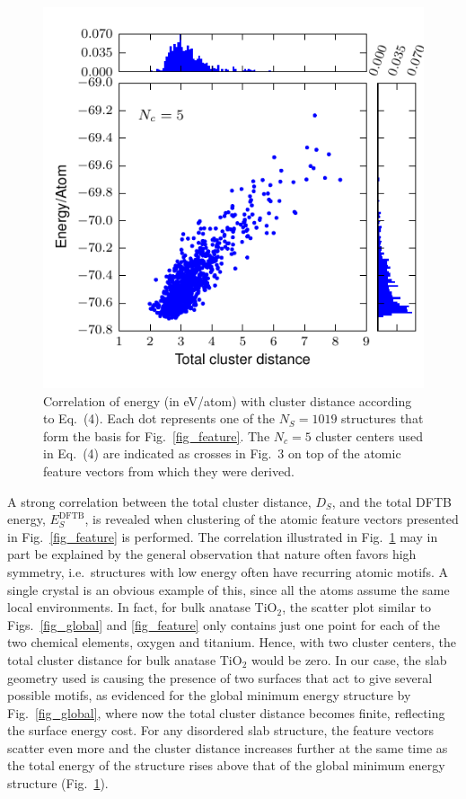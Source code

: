 \documentclass[aip,amsmath,amssymb,reprint]{revtex4-1}
\begin{document}
\begin{figure}[tb]
    \centering
    \includegraphics[width=1.0\columnwidth]{fig4-correlation.pdf}
    \caption{Correlation of energy (in eV/atom) with cluster distance according to Eq.\ (4). Each dot represents one of the $N_S=1019$ structures that form
the basis for Fig.\ \protect\ref{fig_feature}. The $N_c=5$ cluster centers used in Eq.\ (4) are indicated as crosses in Fig.\ 3 on top of the atomic feature vectors from which they were derived.}
    \label{fig_corr}
\end{figure}

A strong correlation between the total
cluster distance, $D_S$, and the total DFTB energy,
$E_S^\mathrm{DFTB}$, is revealed when
clustering of the atomic feature vectors presented in
Fig.\  \ref{fig_feature} is performed. The correlation illustrated in
Fig.\  \ref{fig_corr} may in part be explained by the
general observation that nature often favors high
symmetry\cite{pickard2011}, i.e.\ structures with low energy often have
recurring atomic motifs. A single crystal is an obvious example of
this, since all the atoms assume the same local
environments. In fact, for bulk anatase TiO$_2$, the scatter plot similar to
Figs.\  \ref{fig_global} and \ref{fig_feature} only contains just one point
for each of the two chemical elements, oxygen and titanium. Hence, with
two cluster centers, the total cluster distance for bulk anatase TiO$_2$ would be zero. In our
case, the slab geometry used is causing the presence of two surfaces
that act to give several possible motifs, as evidenced for the global
minimum energy structure by Fig.\  \ref{fig_global}, where now the total cluster
distance becomes finite, reflecting the surface energy cost. For any
disordered slab structure, the feature vectors scatter even more and the cluster distance increases
further at the same time as the total energy of the structure
rises above that of the global minimum energy structure (Fig.\  \ref{fig_corr}).
\end{document}
